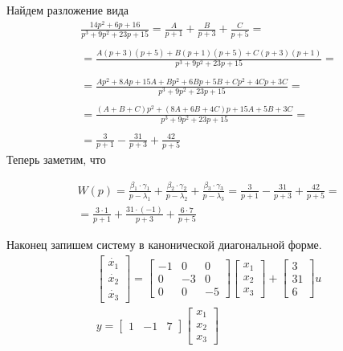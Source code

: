 \documentclass[a5paper, 10pt]{article}
\theoremstyle{definition}
\theoremstyle{plain}
\theoremstyle{remark}
\begin{document}
    Найдем разложение вида
\begin{multline}
      \frac{14 p^2 + 6 p + 16}{p^3 + 9 p^2 + 23 p + 15} = \frac{A}{p+1} + \frac{B}{p+3} + \frac{C}{p+5} =\\\\= \frac{A\left(p+3 \right) \left(p+5 \right) + B \left(p+1 \right) \left(p+5 \right) + C \left(p+3 \right) \left(p+1 \right)}{p^3 + 9 p^2 + 23 p + 15} = \\\\ =
      \frac{Ap^2+8Ap+15A+Bp^2+6Bp+5B+Cp^2+4Cp+3C}{p^3 + 9 p^2 + 23 p + 15} = \\\\ = \frac{\left( A + B + C\right) p^2 + \left( 8A + 6B + 4C\right)p  +15A+5B+3C}{p^3 + 9 p^2 + 23 p + 15} = \\\\ =
      \frac{3}{p+1} - \frac{31}{p+3} + \frac{42}{p+5}
\end{multline}
Теперь заметим, что

\begin{multline}
W(p) = \frac{\beta_1 \cdot \gamma_1}{p-\lambda_1} + \frac{\beta_2 \cdot \gamma_2}{p-\lambda_2} + \frac{\beta_3 \cdot \gamma_3}{p-\lambda_3} = \frac{3}{p+1} - \frac{31}{p+3} + \frac{42}{p+5} =\\
= \frac{3 \cdot 1}{p+1} + \frac{31 \cdot (-1)}{p+3} + \frac{6 \cdot 7}{p+5}
\end{multline}

Наконец запишем систему в канонической диагональной форме.
\begin{multline}
\begin{bmatrix}
\dot{x_1}\\
\dot{x_2}\\
\dot{x_3}
\end{bmatrix}
=
\begin{bmatrix}
-1 & 0 & 0\\
0 & -3 & 0\\
0 & 0 & -5
\end{bmatrix}
\begin{bmatrix}
x_1\\
x_2\\
x_3
\end{bmatrix}
+
\begin{bmatrix}
3\\
31\\
6
\end{bmatrix}
u\\
y = 
\begin{bmatrix}
1 & -1 & 7
\end{bmatrix}
\begin{bmatrix}
x_1\\
x_2\\
x_3
\end{bmatrix}\\
\end{multline}
\end{document}
